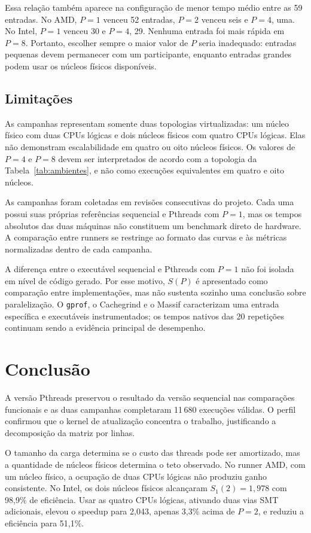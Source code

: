 \documentclass[12pt,a4paper]{article}
\begin{document}
Essa relação também aparece na configuração de menor tempo médio entre as 59
entradas. No AMD, $P=1$ venceu 52 entradas, $P=2$ venceu seis e $P=4$, uma. No
Intel, $P=1$ venceu 30 e $P=4$, 29. Nenhuma entrada foi mais rápida em $P=8$.
Portanto, escolher sempre o maior valor de $P$ seria inadequado: entradas
pequenas devem permanecer com um participante, enquanto entradas grandes podem
usar os núcleos físicos disponíveis.

\subsection{Limitações}

As campanhas representam somente duas topologias virtualizadas: um núcleo
físico com duas CPUs lógicas e dois núcleos físicos com quatro CPUs lógicas.
Elas não demonstram escalabilidade em quatro ou oito núcleos físicos. Os valores
de $P=4$ e $P=8$ devem ser interpretados de acordo com a topologia da
Tabela~\ref{tab:ambientes}, e não como execuções equivalentes em quatro e oito
núcleos.

As campanhas foram coletadas em revisões consecutivas do projeto. Cada uma
possui suas próprias referências sequencial e Pthreads com $P=1$, mas os tempos
absolutos das duas máquinas não constituem um benchmark direto de hardware. A
comparação entre runners se restringe ao formato das curvas e às métricas
normalizadas dentro de cada campanha.

A diferença entre o executável sequencial e Pthreads com $P=1$ não foi isolada
em nível de código gerado. Por esse motivo, $S(P)$ é apresentado como comparação
entre implementações, mas não sustenta sozinho uma conclusão sobre
paralelização. O \texttt{gprof}, o Cachegrind e o Massif caracterizam uma entrada
específica e executáveis instrumentados; os tempos nativos das 20 repetições
continuam sendo a evidência principal de desempenho.

\section{Conclusão}

A versão Pthreads preservou o resultado da versão sequencial nas comparações
funcionais e as duas campanhas completaram 11\,680 execuções válidas. O perfil
confirmou que o kernel de atualização concentra o trabalho, justificando a
decomposição da matriz por linhas.

O tamanho da carga determina se o custo das threads pode ser amortizado, mas a
quantidade de núcleos físicos determina o teto observado. No runner AMD, com um
núcleo físico, a ocupação de duas CPUs lógicas não produziu ganho consistente.
No Intel, os dois núcleos físicos alcançaram $S_1(2)=1,978$ com 98,9\% de
eficiência. Usar as quatro CPUs lógicas, ativando duas vias SMT adicionais,
elevou o speedup para 2,043, apenas 3,3\% acima de $P=2$, e reduziu a eficiência
para 51,1\%.
\end{document}
